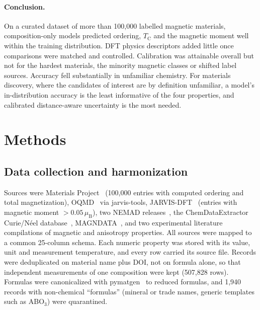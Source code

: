 \documentclass[pdflatex,sn-nature]{sn-jnl}
\newcommand{\muB}{\ensuremath{\mu_\mathrm{B}}}
\newcommand{\Tc}{\ensuremath{T_\mathrm{C}}}
\begin{document}
\paragraph{Conclusion.} On a curated dataset of more than 100,000 labelled magnetic materials, composition-only models predicted ordering, \Tc{} and the magnetic moment well within the training distribution. DFT physics descriptors added little once comparisons were matched and controlled. Calibration was attainable overall but not for the hardest materials, the minority magnetic classes or shifted label sources. Accuracy fell substantially in unfamiliar chemistry. For materials discovery, where the candidates of interest are by definition unfamiliar, a model's in-distribution accuracy is the least informative of the four properties, and calibrated distance-aware uncertainty is the most needed.

\section{Methods}\label{sec:methods}

\subsection{Data collection and harmonization}
Sources were Materials Project~\cite{jain2013materials} (100,000 entries with computed ordering and total magnetization), OQMD~\cite{saal2013oqmd,kirklin2015oqmd} via jarvis-tools, JARVIS-DFT~\cite{choudhary2020jarvis} (entries with magnetic moment $>0.05$\,\muB{}), two NEMAD releases~\cite{itani2025nemad}, the ChemDataExtractor Curie/N\'eel database~\cite{court2018curie}, MAGNDATA~\cite{gallego2016magndata}, and two experimental literature compilations of magnetic and anisotropy properties. All sources were mapped to a common 25-column schema. Each numeric property was stored with its value, unit and measurement temperature, and every row carried its source file. Records were deduplicated on material name plus DOI, not on formula alone, so that independent measurements of one composition were kept (507,828 rows). Formulas were canonicalized with pymatgen~\cite{ong2013pymatgen} to reduced formulas, and 1,940 records with non-chemical ``formulas'' (mineral or trade names, generic templates such as ABO$_3$) were quarantined.
\end{document}
